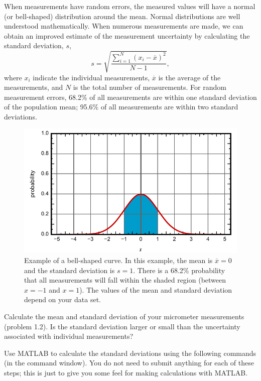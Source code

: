 \documentclass[11pt,letterpaper]{article}
\newcounter{question}[section]
\begin{document}
\question{} When measurements have random errors, the measured values will have a normal (or bell-shaped) distribution around the mean. Normal distributions are well understood mathematically. When numerous measurements are made, we can obtain an improved estimate of the measurement uncertainty by calculating the standard deviation, $s$,
\begin{equation*}
s=\sqrt{\frac{\displaystyle\sum_{i=1}^N(x_i-\overline{x})^2 }{N-1}},
\end{equation*}
where $x_i$ indicate the individual measurements, $\overline{x}$ is the average of the measurements, and $N$ is the total number of measurements. For random measurement errors, 68.2\% of all measurements are within one standard deviation of the population mean; 95.6\% of all measurements are within two standard deviations.
\begin{figure}[h!]
\begin{center}
\includegraphics[]{./bell_curve}
\end{center}
\caption*{Example of a bell-shaped curve. In this example, the mean is $\overline{x}=0$ and the standard deviation is $s=1$. There is a 68.2\% probability that all measurements will fall within the shaded region (between $x=-1$ and $x=1$). The values of the mean and standard deviation depend on your data set.}
\end{figure}

Calculate the mean and standard deviation of your micrometer measurements (problem 1.2). Is the standard deviation larger or small than the uncertainty associated with individual measurements?

Use MATLAB to calculate the standard deviations using the following commands (in the command window). You do not need to submit anything for each of these steps; this is just to give you some feel for making calculations with MATLAB.
\end{document}
